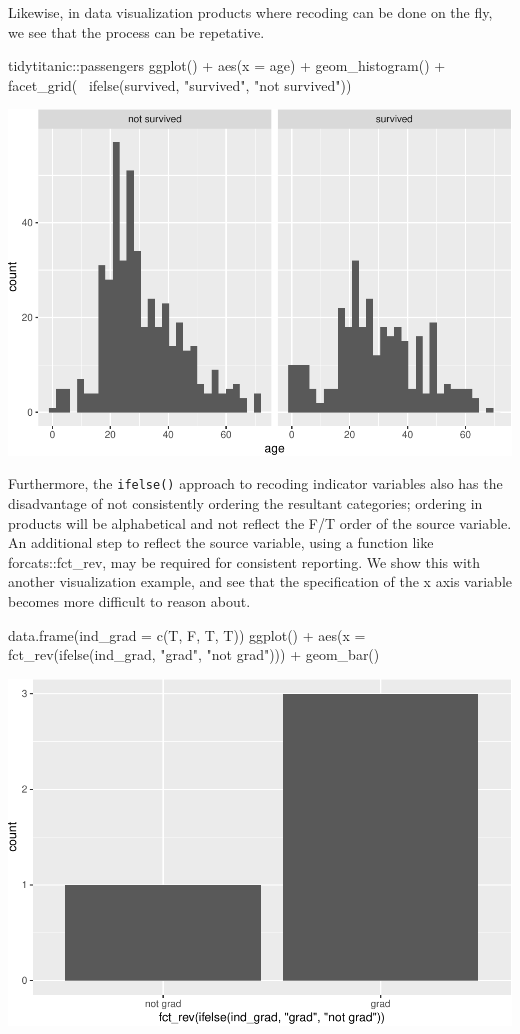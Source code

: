 Likewise, in data visualization products where recoding can be done on
the fly, we see that the process can be repetative.

\begin{Schunk}
\begin{Sinput}
tidytitanic::passengers %
ggplot() + 
  aes(x = age) + 
  geom_histogram() + 
  facet_grid(~ ifelse(survived, 
                      "survived", 
                      "not survived")) 
\end{Sinput}

\includegraphics[width=0.69\linewidth]{r_journal_files/figure-latex/visual_status_quo-1} \end{Schunk}

Furthermore, the \texttt{ifelse()} approach to recoding indicator
variables also has the disadvantage of not consistently ordering the
resultant categories; ordering in products will be alphabetical and not
reflect the F/T order of the source variable. An additional step to
reflect the source variable, using a function like forcats::fct\_rev,
may be required for consistent reporting. We show this with another
visualization example, and see that the specification of the x axis
variable becomes more difficult to reason about.

\begin{Schunk}
\begin{Sinput}
data.frame(ind_grad = c(T, F, T, T)) %
  ggplot() + 
  aes(x = fct_rev(ifelse(ind_grad, "grad", "not grad"))) +
  geom_bar()
\end{Sinput}

\includegraphics[width=0.69\linewidth]{r_journal_files/figure-latex/visual_status_quo_order-1} \end{Schunk}

